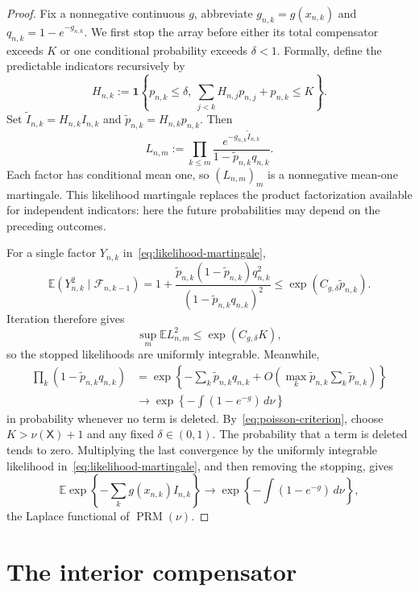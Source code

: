 \documentclass[11pt]{article}
\theoremstyle{remark}
\theoremstyle{plain}
\newcommand{\E}{\mathbb E}
\newcommand{\one}{\mathbf 1}
\newcommand{\cF}{\mathcal F}
\begin{document}
\begin{proof}
Fix a nonnegative continuous $g$, abbreviate
$g_{n,k}=g(x_{n,k})$ and $q_{n,k}=1-e^{-g_{n,k}}$.  We first stop the array
before either its total compensator exceeds $K$ or one conditional
probability exceeds $\delta<1$.  Formally, define the predictable indicators
recursively by
\[
 H_{n,k}:=\one\left\{p_{n,k}\le\delta,
 \ \sum_{j<k}H_{n,j}p_{n,j}+p_{n,k}\le K\right\}.
\]
Set
$\widetilde I_{n,k}=H_{n,k}I_{n,k}$ and
$\widetilde p_{n,k}=H_{n,k}p_{n,k}$.  Then
\begin{equation}\label{eq:likelihood-martingale}
 L_{n,m}:=\prod_{k\le m}
 \frac{e^{-g_{n,k}\widetilde I_{n,k}}}
 {1-\widetilde p_{n,k}q_{n,k}}.
\end{equation}
Each factor has conditional mean one, so $(L_{n,m})_m$ is a nonnegative
mean-one martingale.  This likelihood martingale replaces the product
factorization available for independent indicators: here the future
probabilities may depend on the preceding outcomes.

For a single factor $Y_{n,k}$ in~\eqref{eq:likelihood-martingale},
\[
 \E(Y_{n,k}^2\mid\cF_{n,k-1})
 =1+\frac{\widetilde p_{n,k}(1-\widetilde p_{n,k})q_{n,k}^2}
 {(1-\widetilde p_{n,k}q_{n,k})^2}
 \le \exp(C_{g,\delta}\widetilde p_{n,k}).
\]
Iteration therefore gives
\begin{equation}\label{eq:likelihood-L2}
 \sup_m\E L_{n,m}^2
 \le \exp(C_{g,\delta}K),
\end{equation}
so the stopped likelihoods are uniformly integrable.  Meanwhile,
\begin{align*}
 \prod_k(1-\widetilde p_{n,k}q_{n,k})
 &=\exp\left\{-\sum_k\widetilde p_{n,k}q_{n,k}
       +O\left(\max_k\widetilde p_{n,k}
                    \sum_k\widetilde p_{n,k}\right)\right\}\\
 &\longrightarrow
 \exp\left\{-\int(1-e^{-g})\,d\nu\right\}
\end{align*}
in probability whenever no term is deleted.  By~\eqref{eq:poisson-criterion},
choose $K>\nu(\mathsf X)+1$ and any fixed $\delta\in(0,1)$.  The probability
that a term is deleted tends to zero.  Multiplying the last convergence by
the uniformly integrable likelihood in~\eqref{eq:likelihood-martingale}, and
then removing the stopping, gives
\[
 \E\exp\left\{-\sum_k g(x_{n,k})I_{n,k}\right\}
 \longrightarrow
 \exp\left\{-\int(1-e^{-g})\,d\nu\right\},
\]
the Laplace functional of $\operatorname{PRM}(\nu)$.
\end{proof}

\section{The interior compensator}
\end{document}

